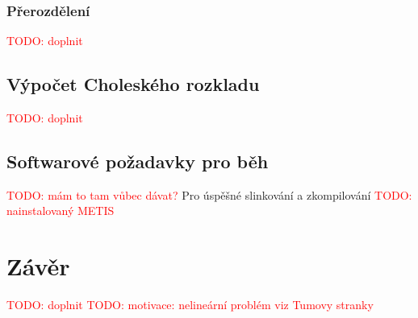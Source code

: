 \documentclass[11pt,american,czech,oneside]{book}
\theoremstyle{plain}
\theoremstyle{definition}
\newcommand{\TODO}[1]{\textcolor{red}{TODO: #1}}
\begin{document}
\subsection{Přerozdělení}
\TODO{doplnit}

\section{Výpočet Choleského rozkladu}
\TODO{doplnit}

\section{Softwarové požadavky pro běh}
\TODO{mám to tam vůbec dávat?}
Pro úspěšné slinkování a zkompilování
\TODO{nainstalovaný METIS}







\chapter*{Závěr}
\TODO{doplnit}
\TODO{motivace: nelineární problém viz Tumovy stranky}


\newpage


\end{document}

